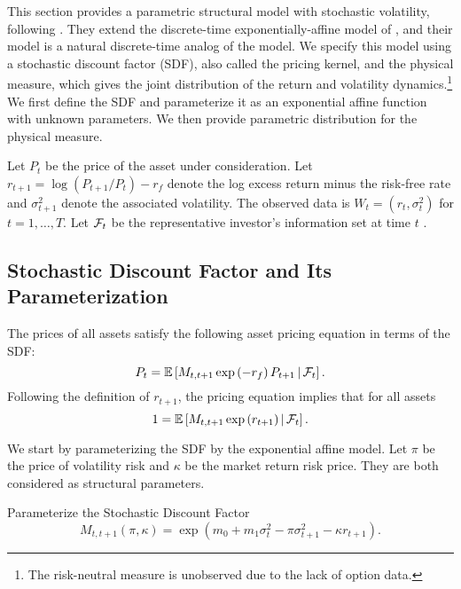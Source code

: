 This section provides a parametric structural model with stochastic volatility, following \textcite{han2018leverage}. They extend the discrete-time exponentially-affine model of \textcite{darolles2006structural}, and their model is a natural discrete-time analog of the \textcite{heston1993closedform} model. We specify this model using a stochastic discount factor (SDF), also called the pricing kernel, and the physical measure, which gives the joint distribution of the return and volatility dynamics.\footnote{The risk-neutral measure is unobserved due to the lack of option data.} We first define the SDF and parameterize it as an exponential affine function with unknown parameters. We then provide parametric distribution for the physical measure. 
  
Let $P_t$ be the price of the asset under consideration. Let $r_{t+1}=\log(P_{t+1}/P_t)-r_f$ denote the log excess return minus the risk-free rate and $\sigma^2_{t+1}$ denote the associated volatility. The observed data is $W_t=(r_t,\sigma^2_{t})$ for $t=1,\ldots,T$. 
Let $\mathcal{F}_t$ be the representative investor's information set at time $t$ . 

\subsection{Stochastic Discount Factor and Its Parameterization}\label{sec:deriving_sdf_functions}

The prices of all assets satisfy the following asset pricing equation in terms of the SDF:
%
\begin{equation}
  P_t = \operatorname{\mathbb{E}}\left[M_{t,t+1} \exp\left(-r_f\right) P_{t+1} \,\middle\vert\, \mathcal{F}_t \right]. 
\end{equation}
%
  Following the definition of $r_{t+1}$, the pricing equation implies that for all assets
%
\begin{equation}
1 = \operatorname{\mathbb{E}}\left[M_{t,t+1} \exp\left(r_{t+1}\right) \,\middle\vert\, \mathcal{F}_t \right].
\end{equation}

We start by parameterizing the SDF by the exponential affine model. Let $\pi$ be the price of volatility risk and $\kappa$ be the market return risk price. They are both considered as structural parameters.

\begin{definition}{Parameterize the Stochastic Discount Factor}
 \label{defn:SDF}
%
 \begin{equation}
    M_{t,t+1}(\pi, \kappa) = \exp\left(m_{0} + m_1 \sigma_t^2 - \pi \sigma^2_{t+1} - \kappa r_{t+1}\right). 
 \end{equation}
\end{definition}


